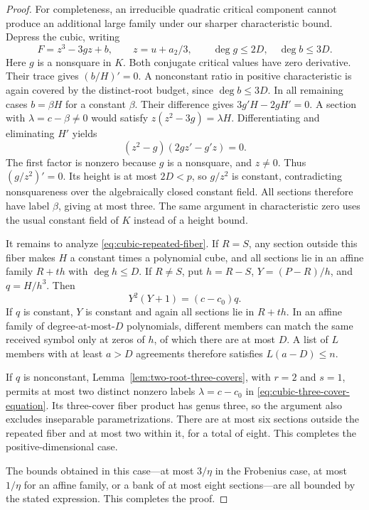 \begin{proof}
For completeness, an irreducible quadratic critical component cannot
produce an additional large family under our sharper characteristic
bound.  Depress the cubic, writing
\[
 F=z^3-3gz+b,\qquad z=u+a_2/3,\qquad
 \deg g\le2D,\quad\deg b\le3D.
\]
Here $g$ is a nonsquare in $K$.  Both conjugate critical values have
zero derivative.  Their trace gives $(b/H)'=0$.  A nonconstant ratio
in positive characteristic is again covered by the distinct-root
budget, since $\deg b\le3D$.  In all remaining cases $b=\beta H$
for a constant $\beta$.
Their difference gives $3g'H-2gH'=0$.
A section with $\lambda=c-\beta\ne0$ would satisfy
$z(z^2-3g)=\lambda H$.  Differentiating and eliminating $H'$ yields
\[
 (z^2-g)(2gz'-g'z)=0.
\]
The first factor is nonzero because $g$ is a nonsquare, and $z\ne0$.
Thus $(g/z^2)'=0$.  Its height is at most $2D<p$, so $g/z^2$ is
constant, contradicting nonsquareness over the algebraically closed
constant field.  All sections therefore have label $\beta$, giving
at most three.  The same argument in characteristic zero uses the
usual constant field of $K$ instead of a height bound.

It remains to analyze \eqref{eq:cubic-repeated-fiber}.  If $R=S$, any
section outside this fiber makes $H$ a constant times a polynomial cube,
and all sections lie in an affine family $R+t h$ with $\deg h\le D$.
If $R\ne S$, put $h=R-S$, $Y=(P-R)/h$, and $q=H/h^3$.  Then
\begin{equation}\label{eq:cubic-three-cover-equation}
 Y^2(Y+1)=(c-c_0)q.
\end{equation}
If $q$ is constant, $Y$ is constant and again all sections lie in
$R+t h$.  In an affine family of degree-at-most-$D$ polynomials,
different members can match the same received symbol only at zeros
of $h$, of which there are at most $D$.  A list of $L$ members with
at least $a>D$ agreements therefore satisfies $L(a-D)\le n$.

If $q$ is nonconstant, Lemma~\ref{lem:two-root-three-covers}, with
$r=2$ and $s=1$, permits at most two distinct nonzero labels
$\lambda=c-c_0$ in \eqref{eq:cubic-three-cover-equation}.
Its three-cover fiber product has genus three, so the argument also
excludes inseparable parametrizations. There are at most six sections
outside the repeated fiber and at most two within it, for a total of
eight. This completes the positive-dimensional case.

The bounds obtained in this case---at most $3/\eta$ in the Frobenius
case, at most $1/\eta$ for an affine family, or a bank of at most eight
sections---are all bounded by the stated expression. This completes
the proof.
\end{proof}

